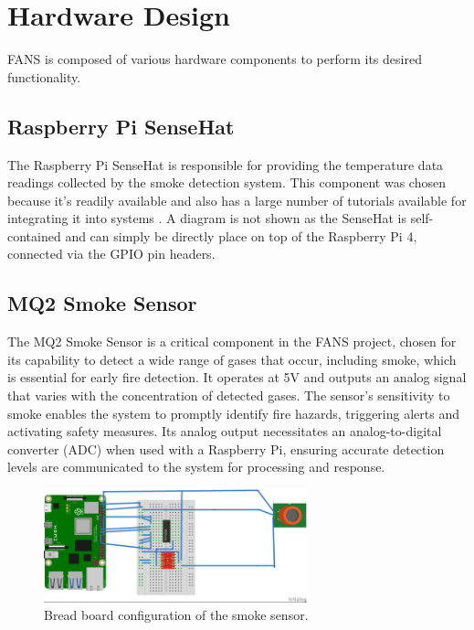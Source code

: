 \section{Hardware Design}

FANS is composed of various hardware components to perform its desired functionality.

\subsection{Raspberry Pi SenseHat}

The Raspberry Pi SenseHat is responsible for providing the temperature data readings collected by the smoke detection
system. This component was chosen because it's readily available and also has a large number of tutorials available for
integrating it into systems \cite{sensehat}. A diagram is not shown as the SenseHat is self-contained and can simply be
directly place on top of the Raspberry Pi 4, connected via the GPIO pin headers.

\subsection{MQ2 Smoke Sensor}

The MQ2 Smoke Sensor is a critical component in the FANS project, chosen for its capability to detect a wide range of
gases that occur, including smoke, which is essential for early fire detection. It operates at 5V and outputs an analog
signal that varies with the concentration of detected gases. The sensor's sensitivity to smoke enables the system to
promptly identify fire hazards, triggering alerts and activating safety measures. Its analog output necessitates an
analog-to-digital converter (ADC) when used with a Raspberry Pi, ensuring accurate detection levels are communicated to
the system for processing and response.

\begin{figure}[H]
    \centering
    \includegraphics[width=3in]{../assets/schematics/MQ2SensorBB.png}
    \caption{Bread board configuration of the smoke sensor.}
\end{figure}

